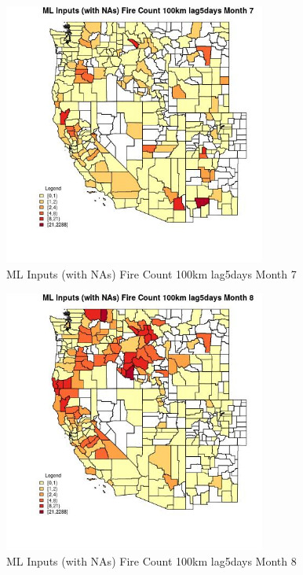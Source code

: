 \clearpage 

\begin{figure} 
\centering  
\includegraphics[width=0.77\textwidth]{Code_Outputs/Report_ML_input_PM25_Step4_part_e_de_duplicated_aves_compiled_2019-05-21wNAs_CountyFire_Count_100km_lag5daysmedianMonth7.jpg} 
\caption{\label{fig:Report_ML_input_PM25_Step4_part_e_de_duplicated_aves_compiled_2019-05-21wNAsCountyFire_Count_100km_lag5daysmedianMonth7}ML Inputs (with NAs) Fire Count 100km lag5days Month 7} 
\end{figure} 
 

\begin{figure} 
\centering  
\includegraphics[width=0.77\textwidth]{Code_Outputs/Report_ML_input_PM25_Step4_part_e_de_duplicated_aves_compiled_2019-05-21wNAs_CountyFire_Count_100km_lag5daysmedianMonth8.jpg} 
\caption{\label{fig:Report_ML_input_PM25_Step4_part_e_de_duplicated_aves_compiled_2019-05-21wNAsCountyFire_Count_100km_lag5daysmedianMonth8}ML Inputs (with NAs) Fire Count 100km lag5days Month 8} 
\end{figure} 
 

